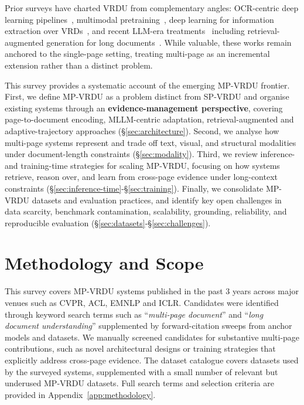 \documentclass[11pt]{article}
\begin{document}
Prior surveys have charted VRDU from complementary angles: OCR-centric deep learning pipelines~\cite{subramani2020survey}, multimodal pretraining~\cite{ding2026deep}, deep learning for information extraction over VRDs~\cite{gbada2025deep}, and recent LLM-era treatments~\cite{ding2025survey} including retrieval-augmented generation for long documents~\cite{gao2025scaling}. While valuable, these works remain anchored to the single-page setting, treating multi-page as an incremental extension rather than a distinct problem. 


This survey provides a systematic account of the emerging MP-VRDU frontier. First, we define MP-VRDU as a problem distinct from SP-VRDU and organise existing systems through an \textbf{evidence-management perspective}, covering page-to-document encoding, MLLM-centric adaptation, retrieval-augmented and adaptive-trajectory approaches (\S\ref{sec:architecture}). Second, we analyse how multi-page systems represent and trade off text, visual, and structural modalities under document-length constraints (\S\ref{sec:modality}). Third, we review inference- and training-time strategies for scaling MP-VRDU, focusing on how systems retrieve, reason over, and learn from cross-page evidence under long-context constraints (\S\ref{sec:inference-time}-\S\ref{sec:training}). Finally, we consolidate MP-VRDU datasets and evaluation practices, and identify key open challenges in data scarcity, benchmark contamination, scalability, grounding, reliability, and reproducible evaluation (\S\ref{sec:datasets}-\S\ref{sec:challenges}).

\section{Methodology and Scope}
\label{sec:methodology}
This survey covers MP-VRDU systems published in the past 3 years across major venues such as CVPR, ACL, EMNLP and ICLR. Candidates were identified through keyword search terms such as ``\textit{multi-page document}'' and ``\textit{long document understanding}'' supplemented by forward-citation sweeps from anchor models and datasets. We manually screened candidates for substantive multi-page contributions, such as novel architectural designs or training strategies that explicitly address cross-page evidence. The dataset catalogue covers datasets used by the surveyed systems, supplemented with a small number of relevant but underused MP-VRDU datasets. Full search terms and selection criteria are provided in Appendix~\ref{app:methodology}.
\end{document}
